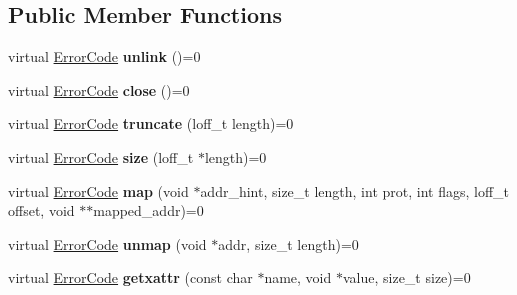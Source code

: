 \subsection*{Public Member Functions}
\begin{DoxyCompactItemize}
\item 
virtual \hyperlink{group__ERRORCODES_ga6263a3c9a0b8d36aea21cdd835ac99fe}{Error\+Code} {\bfseries unlink} ()=0\hypertarget{classalps_1_1RegionFile_aebc5927a8ea77dd8b5e5dacade6caadb}{}\label{classalps_1_1RegionFile_aebc5927a8ea77dd8b5e5dacade6caadb}

\item 
virtual \hyperlink{group__ERRORCODES_ga6263a3c9a0b8d36aea21cdd835ac99fe}{Error\+Code} {\bfseries close} ()=0\hypertarget{classalps_1_1RegionFile_a8173d825ad1971a27f3c32063c5e3fae}{}\label{classalps_1_1RegionFile_a8173d825ad1971a27f3c32063c5e3fae}

\item 
virtual \hyperlink{group__ERRORCODES_ga6263a3c9a0b8d36aea21cdd835ac99fe}{Error\+Code} {\bfseries truncate} (loff\+\_\+t length)=0\hypertarget{classalps_1_1RegionFile_ac03917df3c8e74f7110b7c8226c69e6f}{}\label{classalps_1_1RegionFile_ac03917df3c8e74f7110b7c8226c69e6f}

\item 
virtual \hyperlink{group__ERRORCODES_ga6263a3c9a0b8d36aea21cdd835ac99fe}{Error\+Code} {\bfseries size} (loff\+\_\+t $\ast$length)=0\hypertarget{classalps_1_1RegionFile_a8ca8db1813b07d36eef4c04221724f47}{}\label{classalps_1_1RegionFile_a8ca8db1813b07d36eef4c04221724f47}

\item 
virtual \hyperlink{group__ERRORCODES_ga6263a3c9a0b8d36aea21cdd835ac99fe}{Error\+Code} {\bfseries map} (void $\ast$addr\+\_\+hint, size\+\_\+t length, int prot, int flags, loff\+\_\+t offset, void $\ast$$\ast$mapped\+\_\+addr)=0\hypertarget{classalps_1_1RegionFile_a10d615eb7caa3613f75bd36b62ccb5d8}{}\label{classalps_1_1RegionFile_a10d615eb7caa3613f75bd36b62ccb5d8}

\item 
virtual \hyperlink{group__ERRORCODES_ga6263a3c9a0b8d36aea21cdd835ac99fe}{Error\+Code} {\bfseries unmap} (void $\ast$addr, size\+\_\+t length)=0\hypertarget{classalps_1_1RegionFile_a0b116f89f3f3ff685d7b942e52f64cb5}{}\label{classalps_1_1RegionFile_a0b116f89f3f3ff685d7b942e52f64cb5}

\item 
virtual \hyperlink{group__ERRORCODES_ga6263a3c9a0b8d36aea21cdd835ac99fe}{Error\+Code} {\bfseries getxattr} (const char $\ast$name, void $\ast$value, size\+\_\+t size)=0\hypertarget{classalps_1_1RegionFile_a93bd994b1d794e52dae032bc1a61035d}{}\label{classalps_1_1RegionFile_a93bd994b1d794e52dae032bc1a61035d}


\end{DoxyCompactItemize}
